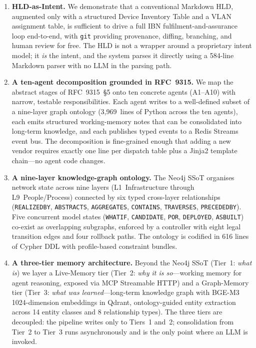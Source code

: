 \documentclass[acmtog]{acmart}
\renewcommand\_{\textunderscore\allowbreak}
\begin{document}
\begin{enumerate}[label=\textbf{C\arabic*.}]
  \item \textbf{HLD-as-Intent.} We demonstrate that a conventional
    Markdown HLD, augmented only with a structured Device Inventory
    Table and a VLAN assignment table, is sufficient to drive a full
    IBN fulfilment-and-assurance loop end-to-end, with \texttt{git}
    providing provenance, diffing, branching, and human review for
    free. The HLD is not a wrapper around a proprietary intent
    model; it \emph{is} the intent, and the system parses it
    directly using a 584-line Markdown parser with no LLM in the
    parsing path.

  \item \textbf{A ten-agent decomposition grounded in RFC~9315.} We
    map the abstract stages of RFC~9315~\S5 onto ten concrete agents
    (A1--A10) with narrow, testable responsibilities. Each agent
    writes to a well-defined subset of a nine-layer graph ontology
    (3,969~lines of Python across the ten agents), each emits
    structured working-memory notes that can be consolidated into
    long-term knowledge, and each publishes typed events to a Redis
    Streams event bus. The decomposition is fine-grained enough that
    adding a new vendor requires exactly one line per dispatch table
    plus a Jinja2 template chain---no agent code changes.

  \item \textbf{A nine-layer knowledge-graph ontology.} The Neo4j
    SSoT organises network state across nine layers
    (L1~Infrastructure through L9~People/Process) connected by six
    typed cross-layer relationships (\texttt{REALIZED\_BY},
    \texttt{ABSTRACTS}, \texttt{AGGREGATES}, \texttt{CONTAINS},
    \texttt{TRAVERSES}, \texttt{PRECEDED\_BY}). Five concurrent model
    states (\texttt{WHAT\_IF}, \texttt{CANDIDATE}, \texttt{POR},
    \texttt{DEPLOYED}, \texttt{AS\_BUILT}) co-exist as overlapping
    subgraphs, enforced by a controller with eight legal transition
    edges and four rollback paths. The ontology is codified in 616
    lines of Cypher DDL with profile-based constraint bundles.

  \item \textbf{A three-tier memory architecture.} Beyond the Neo4j
    SSoT (Tier~1: \emph{what is}) we layer a Live-Memory tier
    (Tier~2: \emph{why it is so}---working memory for agent
    reasoning, exposed via MCP Streamable HTTP) and a Graph-Memory
    tier (Tier~3: \emph{what was learned}---long-term knowledge graph
    with BGE-M3 1024-dimension embeddings in Qdrant, ontology-guided
    entity extraction across 14 entity classes and 8 relationship
    types). The three tiers are decoupled: the pipeline writes only
    to Tiers~1 and~2; consolidation from Tier~2 to Tier~3 runs
    asynchronously and is the only point where an LLM is invoked.


\end{enumerate}
\end{document}
